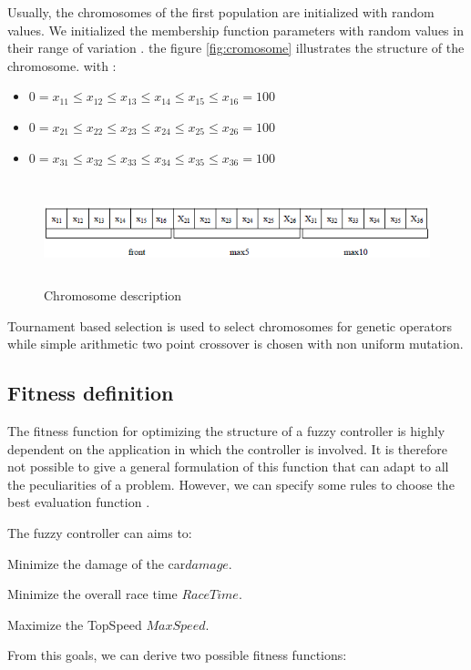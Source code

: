 \documentclass[runningheads,a4paper]{llncs}
\begin{document}
Usually, the chromosomes of the first population are initialized with random values. We initialized the membership function parameters with random values in their range of variation \cite{3}. the figure \ref {fig:cromosome} illustrates the structure of the chromosome.
with  :
\begin{itemize}
	\item []$0 = x_{11} \leq x_{12} \leq x_{13} \leq x_{14} \leq x_{15} \leq x_{16} = 100$
	\item []$0 = x_{21} \leq x_{22} \leq x_{23} \leq x_{24} \leq x_{25} \leq x_{26} = 100$
	\item []$0 = x_{31} \leq x_{32} \leq x_{33} \leq x_{34} \leq x_{35} \leq x_{36} = 100$
\end{itemize}
\begin{figure}[!ht]	
	\begin{center}
		\includegraphics[width=13cm,height=3cm]{fig/cromosome}
		\caption{Chromosome description}
		\label{fig: cromosome}	
	\end{center}	
\end{figure}
Tournament based selection is used to select chromosomes for genetic operators while simple arithmetic two point  crossover is chosen with non uniform mutation.

\subsection{Fitness definition}

The fitness function for optimizing the structure of a fuzzy controller is highly dependent on the application in which the controller is involved. It is therefore not possible to give a general formulation of this function that can adapt to all the peculiarities of a problem. However, we can specify some rules to choose the best evaluation function \cite{elsayed13}.

The fuzzy controller can aims to: 
\begin{description}
	\item  Minimize the damage of the car$damage$.
	\item  Minimize the overall race time $RaceTime$.
	\item  Maximize the TopSpeed $MaxSpeed$.		
\end{description}
From this goals, we can derive two possible fitness functions:
\end{document}
